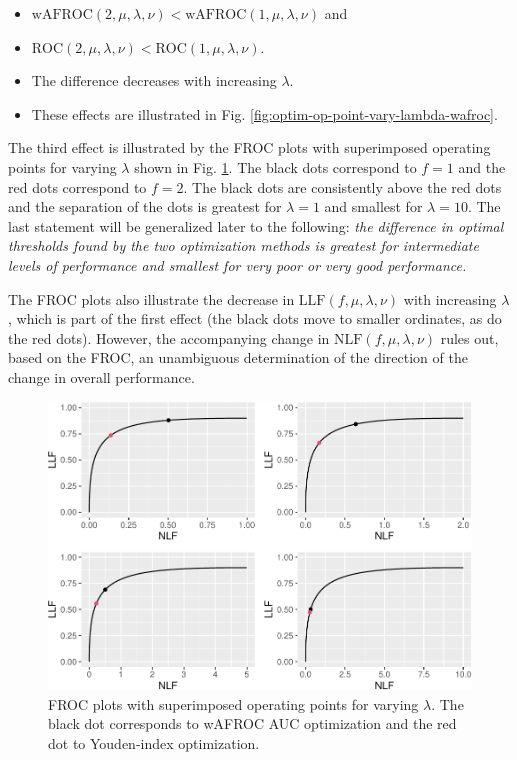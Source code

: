 \documentclass[
]{book}
\providecommand{\tightlist}{%
  \setlength{\itemsep}{0pt}\setlength{\parskip}{0pt}}
\begin{document}
\begin{enumerate}
  \begin{itemize}
  \tightlist
  \item
    \(\text{wAFROC} \left (2, \mu, \lambda, \nu \right ) < \text{wAFROC} \left (1, \mu, \lambda, \nu \right )\) and
  \item
    \(\text{ROC} \left (2, \mu, \lambda, \nu \right ) < \text{ROC} \left (1, \mu, \lambda, \nu \right )\).
  \item
    The difference decreases with increasing \(\lambda\).
  \item
    These effects are illustrated in Fig. \ref{fig:optim-op-point-vary-lambda-wafroc}.
  \end{itemize}
\end{enumerate}

The third effect is illustrated by the FROC plots with superimposed operating points for varying \(\lambda\) shown in Fig. \ref{fig:optim-op-point-vary-lambda-froc}. The black dots correspond to \(f = 1\) and the red dots correspond to \(f = 2\). The black dots are consistently above the red dots and the separation of the dots is greatest for \(\lambda = 1\) and smallest for \(\lambda = 10\). The last statement will be generalized later to the following: \emph{the difference in optimal thresholds found by the two optimization methods is greatest for intermediate levels of performance and smallest for very poor or very good performance.}

The FROC plots also illustrate the decrease in \(\text{LLF} \left ( f, \mu, \lambda, \nu \right )\) with increasing \(\lambda\), which is part of the first effect (the black dots move to smaller ordinates, as do the red dots). However, the accompanying change in \(\text{NLF} \left ( f, \mu, \lambda, \nu \right )\) rules out, based on the FROC, an unambiguous determination of the direction of the change in overall performance.

\begin{figure}
\centering
\includegraphics{21-optim-op-point_files/figure-latex/optim-op-point-vary-lambda-froc-1.pdf}
\caption{\label{fig:optim-op-point-vary-lambda-froc}FROC plots with superimposed operating points for varying \(\lambda\). The black dot corresponds to wAFROC AUC optimization and the red dot to Youden-index optimization.}
\end{figure}
\end{document}
